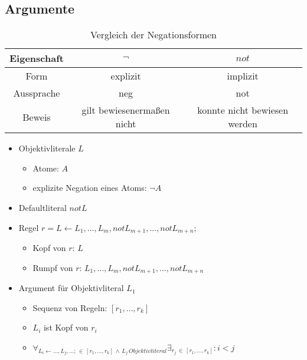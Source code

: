 \documentclass[nonacm=true, language=german]{acmart}
\begin{document}
\subsection{Argumente}

\begin{table}[ht]
    \centering
    \begin{tabular}{c|c c}
        \toprule
        Eigenschaft & $\neg$                        & $not$ \\
        \midrule
        Form        & explizit                       & implizit \\
        Aussprache  & neg                            & not \\
        Beweis      & gilt bewiesenermaßen nicht     & konnte nicht bewiesen werden \\
        \bottomrule
    \end{tabular}
    \caption{Vergleich der Negationsformen}
    \label{tab:negation}
\end{table}

\begin{itemize}
    \item Objektivliterale $L$
    \begin{itemize}
        \item Atome: $A$
        \item explizite Negation eines Atoms: $\neg A$
    \end{itemize}
    
    \item Defaultliteral $not L$
    \item Regel $ r = L \leftarrow L_1, \dots, L_m, not L_{m+1}, \dots, not L_{m+n}; $
    \begin{itemize}
        \item Kopf von $r$: $L$
        \item Rumpf von $r$: $ L_1, \dots, L_m, not L_{m+1}, \dots, not L_{m+n} $
    \end{itemize}
    
    \item Argument für Objektivliteral $L_1$
    \begin{itemize}
        \item Sequenz von Regeln: $ [r_1, \dots, r_k] $
        \item $L_i$ ist Kopf von $r_i$
        \item $ \forall_{L_i \leftarrow \dots, L_j, \dots; \, \in \, [r_1, \dots, r_k] \, \wedge \, L_j \, Objektivliteral} \exists_{r_j \, \in \, [r_1, \dots, r_k]}: i < j $
    \end{itemize}
\end{itemize}
\end{document}
